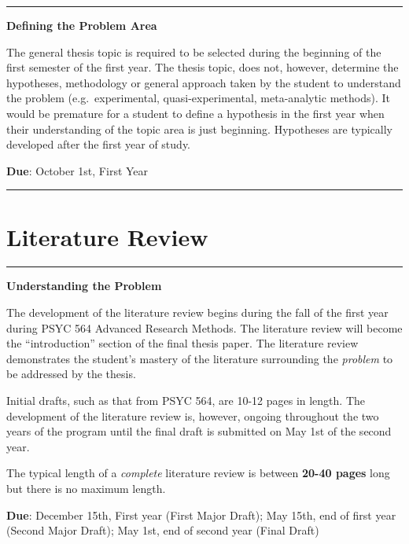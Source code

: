 \documentclass[openany]{book}
\begin{document}
\begin{center}\rule{0.5\linewidth}{0.5pt}\end{center}

\textbf{Defining the Problem Area}

The general thesis topic is required to be selected during the beginning of the first semester of the first year. The thesis topic, does not, however, determine the hypotheses, methodology or general approach taken by the student to understand the problem (e.g.~experimental, quasi-experimental, meta-analytic methods). It would be premature for a student to define a hypothesis in the first year when their understanding of the topic area is just beginning. Hypotheses are typically developed after the first year of study.

\textbf{Due}: October 1st, First Year

\begin{center}\rule{0.5\linewidth}{0.5pt}\end{center}

\hypertarget{literature-review}{%
\section{Literature Review}\label{literature-review}}

\begin{center}\rule{0.5\linewidth}{0.5pt}\end{center}

\textbf{Understanding the Problem}

The development of the literature review begins during the fall of the first year during PSYC 564 Advanced Research Methods. The literature review will become the ``introduction'' section of the final thesis paper. The literature review demonstrates the student's mastery of the literature surrounding the \emph{problem} to be addressed by the thesis.

Initial drafts, such as that from PSYC 564, are 10-12 pages in length. The development of the literature review is, however, ongoing throughout the two years of the program until the final draft is submitted on May 1st of the second year.

The typical length of a \emph{complete} literature review is between \textbf{20-40 pages} long but there is no maximum length.

\textbf{Due}: December 15th, First year (First Major Draft); May 15th, end of first year (Second Major Draft); May 1st, end of second year (Final Draft)
\end{document}
